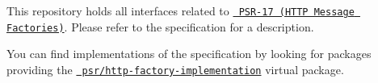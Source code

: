 This repository holds all interfaces related to \href{https://www.php-fig.org/psr/psr-17/}{\texttt{ PSR-\/17 (HTTP Message Factories)}}. Please refer to the specification for a description.

You can find implementations of the specification by looking for packages providing the \href{https://packagist.org/providers/psr/http-factory-implementation}{\texttt{ psr/http-\/factory-\/implementation}} virtual package. 